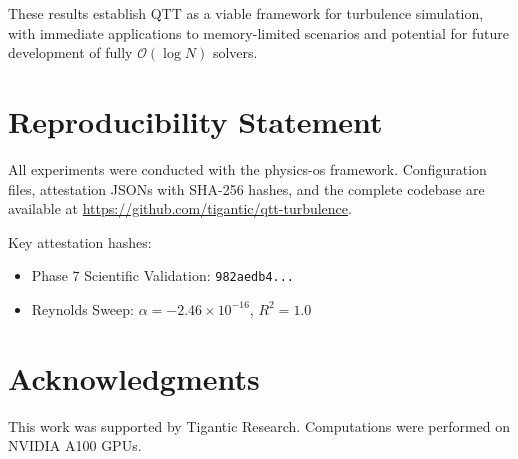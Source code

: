 \documentclass[11pt,a4paper]{article}
\newcommand{\bigO}{\mathcal{O}}
\theoremstyle{definition}
\begin{document}
These results establish QTT as a viable framework for turbulence simulation, with immediate applications to memory-limited scenarios and potential for future development of fully $\bigO(\log N)$ solvers.

\section*{Reproducibility Statement}

All experiments were conducted with the physics-os framework.
Configuration files, attestation JSONs with SHA-256 hashes, and the complete codebase are available at \url{https://github.com/tigantic/qtt-turbulence}.

Key attestation hashes:
\begin{itemize}
    \item Phase 7 Scientific Validation: \texttt{982aedb4...}
    \item Reynolds Sweep: $\alpha = -2.46 \times 10^{-16}$, $R^2 = 1.0$
\end{itemize}

\section*{Acknowledgments}

This work was supported by Tigantic Research.
Computations were performed on NVIDIA A100 GPUs.
\end{document}
